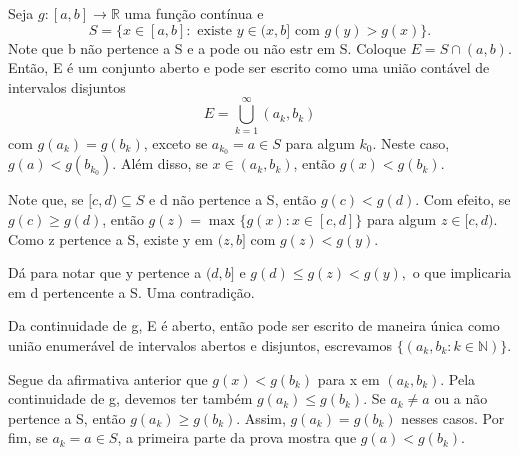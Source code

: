 \documentclass[../analysis_notes.tex]{subfiles}
\begin{document}
\hypertarget{rising_sun}{
	\begin{theorem*}
		Seja \(g:[a, b]\rightarrow \mathbb{R}\) uma função contínua e
		\[
			S=\{x\in [a, b]:\text{ existe }y\in(x, b]\text{ com }g(y)>g(x)\}.
		\]
		Note que b não pertence a S e a pode ou não estr em S. Coloque \(E=S\cap (a, b)\). Então, E é um conjunto aberto e pode ser escrito como uma união contável de intervalos disjuntos
		\[
			E=\bigcup_{k=1}^{\infty}(a_{k}, b_{k})
		\]
		com \(g(a_{k})=g(b_{k})\), exceto se \(a_{k_{0}}=a\in S\) para algum \(k_{0}\). Neste caso, \(g(a)<g(b_{k_{0}})\). Além disso, se \(x\in (a_{k}, b_{k})\), então \(g(x)<g(b_{k})\).
	\end{theorem*}
}
\begin{proof*}
	Note que, se \([c, d)\subseteq S\) e d não pertence a S, então \(g(c)<g(d)\). Com efeito, se \(g(c)\geq g(d)\), então \(g(z)=\max_{}\{g(x):x\in [c, d]\}\) para algum \(z\in [c, d).\) Como z pertence a S, existe y em \((z, b]\) com \(g(z)<g(y)\).

			Dá para notar que y pertence a \((d, b]\) e \(g(d)\leq g(z)<g(y),\) o que implicaria em d pertencente a S. Uma contradição.

	Da continuidade de g, E é aberto, então pode ser escrito de maneira única como união enumerável de intervalos abertos e disjuntos, escrevamos \(\{(a_{k}, b_{k}: k\in \mathbb{N})\}\).

	Segue da afirmativa anterior que \(g(x)<g(b_{k})\) para x em \((a_{k}, b_{k})\). Pela continuidade de g, devemos ter também \(g(a_{k})\leq g(b_{k})\). Se \(a_{k}\neq a\) ou a não pertence a S, então \(g(a_{k})\geq g(b_{k})\). Assim, \(g(a_{k})=g(b_{k})\) nesses casos. Por fim, se \(a_{k}=a\in S\), a primeira parte da prova mostra que \(g(a)<g(b_{k})\). \qedsymbol
\end{proof*}
\end{document}
